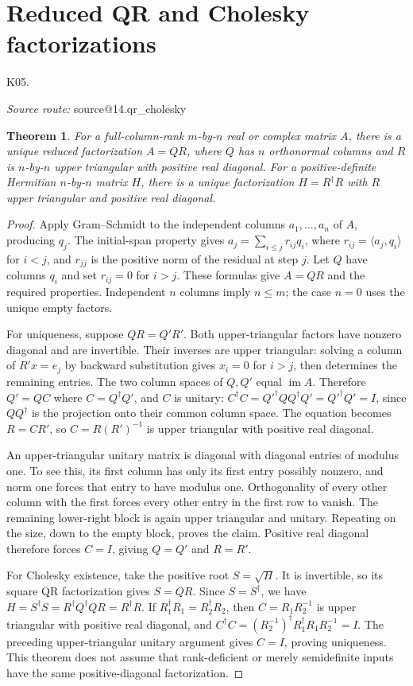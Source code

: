 \documentclass[11pt,a4paper]{book}
\makeatletter
\newtheorem{theorem}{Theorem}[chapter]
\theoremstyle{definition}\newtheorem{definition}[theorem]{Definition}
\theoremstyle{remark}\newtheorem{remark}[theorem]{Remark}
\DeclareMathOperator{\im}{im}\DeclareMathOperator{\rank}{rank}
\newcommand{\ip}[2]{\langle #1,#2\rangle}
\newcommand{\Kentry}[2]{\section{#2}\label{k:#1}\noindent\textsf{\small K05.\detokenize{#1}}\par
  \begingroup\small\color{black!65}\textit{Source route: }\csname source@#1\endcsname\par\endgroup}
\makeatother
\begin{document}
\Kentry{14.qr_cholesky}{Reduced QR and Cholesky factorizations}
\begin{theorem}
For a full-column-rank $m$-by-$n$ real or complex matrix $A$, there is a unique reduced factorization $A=QR$, where $Q$ has $n$ orthonormal columns and $R$ is $n$-by-$n$ upper triangular with positive real diagonal. For a positive-definite Hermitian $n$-by-$n$ matrix $H$, there is a unique factorization $H=R^\dagger R$ with $R$ upper triangular and positive real diagonal.
\end{theorem}
\begin{proof}
Apply Gram--Schmidt to the independent columns $a_1,\ldots,a_n$ of $A$, producing $q_j$. The initial-span property gives
$a_j=\sum_{i\le j}r_{ij}q_i$, where $r_{ij}=\ip{a_j}{q_i}$ for $i<j$, and $r_{jj}$ is the positive norm of the residual at step $j$. Let $Q$ have columns $q_i$ and set $r_{ij}=0$ for $i>j$. These formulas give $A=QR$ and the required properties. Independent $n$ columns imply $n\le m$; the case $n=0$ uses the unique empty factors.

For uniqueness, suppose $QR=Q'R'$. Both upper-triangular factors have nonzero diagonal and are invertible. Their inverses are upper triangular: solving a column of $R'x=e_j$ by backward substitution gives $x_i=0$ for $i>j$, then determines the remaining entries. The two column spaces of $Q,Q'$ equal $\im A$. Therefore $Q'=QC$ where $C=Q^\dagger Q'$, and $C$ is unitary: $C^\dagger C=Q'^\dagger QQ^\dagger Q'=Q'^\dagger Q'=I$, since $QQ^\dagger$ is the projection onto their common column space. The equation becomes $R=CR'$, so $C=R(R')^{-1}$ is upper triangular with positive real diagonal.

An upper-triangular unitary matrix is diagonal with diagonal entries of modulus one. To see this, its first column has only its first entry possibly nonzero, and norm one forces that entry to have modulus one. Orthogonality of every other column with the first forces every other entry in the first row to vanish. The remaining lower-right block is again upper triangular and unitary. Repeating on the size, down to the empty block, proves the claim. Positive real diagonal therefore forces $C=I$, giving $Q=Q'$ and $R=R'$.

For Cholesky existence, take the positive root $S=\sqrt H$. It is invertible, so its square QR factorization gives $S=QR$. Since $S=S^\dagger$, we have $H=S^\dagger S=R^\dagger Q^\dagger QR=R^\dagger R$. If $R_1^\dagger R_1=R_2^\dagger R_2$, then $C=R_1R_2^{-1}$ is upper triangular with positive real diagonal, and
$C^\dagger C=(R_2^{-1})^\dagger R_1^\dagger R_1R_2^{-1}=I$.
The preceding upper-triangular unitary argument gives $C=I$, proving uniqueness. This theorem does not assume that rank-deficient or merely semidefinite inputs have the same positive-diagonal factorization.
\end{proof}
\end{document}
